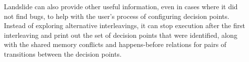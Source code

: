 Landslide can also provide other useful information, even in cases where it did not find bugs, to help with the user's process of configuring decision points. Instead of exploring alternative interleavings, it can stop execution after the first interleaving and print out the set of decision points that were identified, along with the shared memory conflicts and happens-before relations for pairs of transitions between the decision points.
